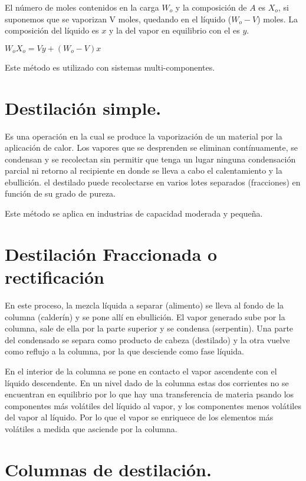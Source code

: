 \documentclass[11pt,openany]{book}
\begin{document}
El número de moles contenidos en la carga $W_o$ y la composición de $A$ es $X_o$, si suponemos que se 
vaporizan V moles, quedando en el líquido ($W_o - V$) moles. La composición del líquido es $x$ y la del 
vapor en equilibrio con el es $y$.

$W_o X_o = V y +(W_o -V) x$


Este método es utilizado con sistemas multi-componentes.

\section {Destilación simple.}

Es una operación en la cual se produce la vaporización de un material por la aplicación de calor. Los 
vapores que se desprenden se eliminan contínuamente, se condensan y se recolectan sin permitir 
que tenga un lugar ninguna condensación parcial ni retorno al recipiente en donde se lleva a cabo 
el calentamiento y la ebullición. el destilado puede recolectarse en varios lotes separados
 (fracciones) en función de su grado de pureza.

 Este método se aplica en industrias de capacidad moderada y pequeña.

 \section{Destilación Fraccionada o rectificación}

En este proceso, la mezcla líquida a separar (alimento) se lleva al fondo de la columna (calderín) y 
se pone allí en ebullición. El vapor generado sube por la columna, sale de ella por la parte superior y 
se condensa (serpentin). Una parte del condensado se separa como producto de cabeza (destilado) y la otra 
vuelve como reflujo a la columna, por la que desciende como fase líquida.

En el interior de la columna se pone en contacto el vapor ascendente con el líquido descendente. 
En un nivel dado de la columna estas dos corrientes no se encuentran en equilibrio por lo que hay 
una transferencia de materia psando los componentes más volátiles del líquido al vapor, y los 
componentes menos volátiles del vapor al líquido. Por lo que el vapor se enriquece de los 
elementos más volátiles a medida que asciende por la columna.

\section {Columnas de destilación.}
\end{document}
